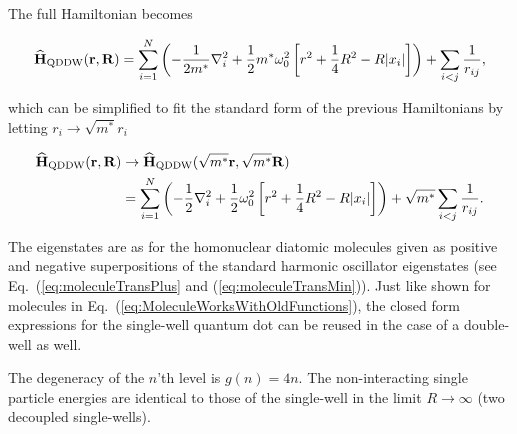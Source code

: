 The full Hamiltonian becomes

\begin{equation}
  {\bf\widehat{H}}_{\mathrm{QDDW}}(\mathbf{r}, \mathbf{R}) = \sum_{i=1}^N \left(-\frac{1}{2m^\ast}\nabla_i^2 + \frac{1}{2}m^\ast \omega_0^2 \left[r^2 + \frac{1}{4}R^2 - R|x_i|\right]  \right) + \sum_{i<j} \frac{1}{r_{ij}},
\end{equation}

which can be simplified to fit the standard form of the previous Hamiltonians by letting $r_i\to\sqrt{m^\ast}r_i$

\begin{align}
  {\bf\widehat{H}}_{\mathrm{QDDW}}(\mathbf{r}, \mathbf{R}) &\to {\bf\widehat{H}}_{\mathrm{QDDW}}(\sqrt{m^\ast}\mathbf{r}, \sqrt{m^\ast}\mathbf{R}) \\
   &=\sum_{i=1}^N \left(-\frac{1}{2}\nabla_i^2 + \frac{1}{2} \omega_0^2 \left[r^2 + \frac{1}{4}R^2 - R|x_i|\right]  \right) + \sqrt{m^\ast}\sum_{i<j} \frac{1}{r_{ij}}.
\end{align}

The eigenstates are as for the homonuclear diatomic molecules given as positive and negative superpositions of the standard harmonic oscillator eigenstates (see Eq.~(\ref{eq:moleculeTransPlus} and (\ref{eq:moleculeTransMin})). Just like shown for molecules in Eq.~(\ref{eq:MoleculeWorksWithOldFunctions}), the closed form expressions for the single-well quantum dot can be reused in the case of a double-well as well. 

The degeneracy of the $n$'th level is $g(n) = 4n$. The non-interacting single particle energies are identical to those of the single-well in the limit $R\to\infty$ (two decoupled single-wells).

